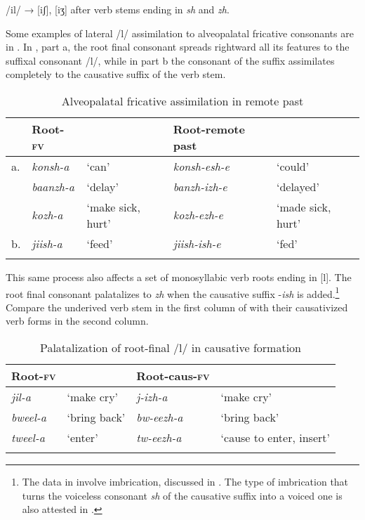 \documentclass[output=paper]{langsci/langscibook}
\begin{document}
\ea
\label{ex:3.kawasha}
/il/ → [iʃ], [iʒ] after verb stems ending in \textit{sh} and \textit{zh}.
\z

Some examples of lateral /l/ assimilation to alveopalatal fricative consonants are in . In , part a, the root final consonant spreads rightward all its features to the suffixal consonant /l/, while in part b the consonant of the suffix assimilates completely to the causative suffix of the verb stem. 

\begin{table}
\begin{tabularx}{\textwidth}{llllX}
\lsptoprule
 & Root-\textsc{fv} &  & Root-remote past & \\
\midrule
a. & \textit{konsh-a} & `can' & \textit{konsh-esh-e} & `could' \\
 & \textit{baanzh-a} & `delay' & \textit{banzh-izh-e} & `delayed' \\
 & \textit{kozh-a} & `make sick, hurt' & \textit{kozh-ezh-e} & `made sick, hurt' \\
\tablevspace
b. & \textit{jiish-a} & `feed' & \textit{jiish-ish-e} & `fed' \\
\lspbottomrule
\end{tabularx}

\caption{Alveopalatal fricative assimilation in remote past}
\label{tab:5.kawasha}

\end{table}


This same process also affects a set of monosyllabic verb roots ending in [l]. The root final consonant palatalizes to \textit{zh} when the causative suffix -\textit{ish} is added.\footnote{The data in  involve imbrication, discussed in . The type of imbrication that turns the voiceless consonant \textit{sh} of the causative suffix into a voiced one is also attested in  \citep[73]{lukusa1993}.} Compare the underived verb stem in the first column of  with their causativized verb forms in the second column.

\begin{table}
\begin{tabularx}{\textwidth}{XXXl}
\lsptoprule
  Root-\textsc{fv} &  &   Root-caus-\textsc{fv} & \\
\midrule
\textit{jil-a} & `make cry' & \textit{j-izh-a} & `make cry' \\
\textit{bweel-a} & `bring back' & \textit{bw-eezh-a} & `bring back' \\
\textit{tweel-a} & `enter' & \textit{tw-eezh-a} & `cause to enter, insert' \\

\lspbottomrule
\end{tabularx}

\caption{Palatalization of root-final /l/ in causative formation}
\label{tab:6.kawasha}

 \end{table}
\end{document}
